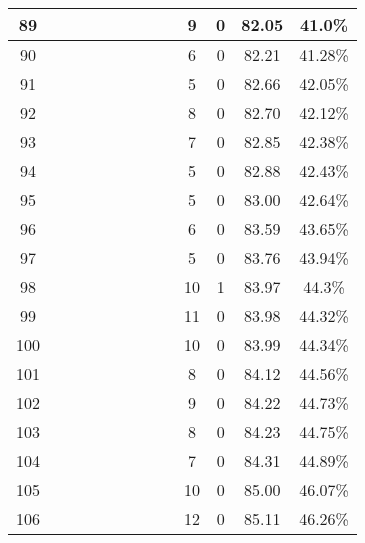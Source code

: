 \begin{longtable}{|c|c|c|c|c|c|c|c|c|c|c|c|c|}
89 &  \x    & \x    & \x    &       & \x\m  &       &       &       & 9 & 0 & 82.05 & 41.0\% \\ \hline
90 &  \x    & \x    &       &       &       &       &       &       & 6 & 0 & 82.21 & 41.28\% \\ \hline
91 &  \x    & \x    & \x    & \x    &       & \x    &       & \x    & 5 & 0 & 82.66 & 42.05\% \\ \hline
92 &  \x    & \x    &       & \x    & \x    & \x    &       &       & 8 & 0 & 82.70 & 42.12\% \\ \hline
93 &  \x    & \x    & \x    & \x    &       & \x\m  & \x\m  &       & 7 & 0 & 82.85 & 42.38\% \\ \hline
94 &  \x    & \x    &       &       & \x    & \x    &       & \x    & 5 & 0 & 82.88 & 42.43\% \\ \hline
95 &  \x    & \x    &       &       & \x    &       &       & \x    & 5 & 0 & 83.00 & 42.64\% \\ \hline
96 &  \x    & \x    & \x    &       &       & \x    & \x\m  &       & 6 & 0 & 83.59 & 43.65\% \\ \hline
97 &  \x    & \x    & \x    & \x    & \x    &       & \x\m  &       & 5 & 0 & 83.76 & 43.94\% \\ \hline
98 &  \x    & \x    &       &       & \x    & \x    & \x    &       & 10 & 1 & 83.97 & 44.3\% \\ \hline
99 &  \x    & \x    &       & \x    &       & \x    &       &       & 11 & 0 & 83.98 & 44.32\% \\ \hline
100 &  \x    & \x    & \x    &       &       &       & \x\m  &       & 10 & 0 & 83.99 & 44.34\% \\ \hline
101 &  \x    & \x    & \x    & \x    & \x    & \x\m  & \x\m  &       & 8 & 0 & 84.12 & 44.56\% \\ \hline
102 &  \x    & \x    & \x    &       &       & \x    &       & \x    & 9 & 0 & 84.22 & 44.73\% \\ \hline
103 &  \x    & \x    & \x    & \x    &       & \x    &       & \x\m  & 8 & 0 & 84.23 & 44.75\% \\ \hline
104 &  \x    & \x    & \x    &       &       & \x    &       &       & 7 & 0 & 84.31 & 44.89\% \\ \hline
105 &  \x    & \x    & \x    & \x    &       & \x\m  & \x    &       & 10 & 0 & 85.00 & 46.07\% \\ \hline
106 &  \x    & \x    &       & \x    & \x    &       &       &       & 12 & 0 & 85.11 & 46.26\% \\ \hline

\end{longtable}
